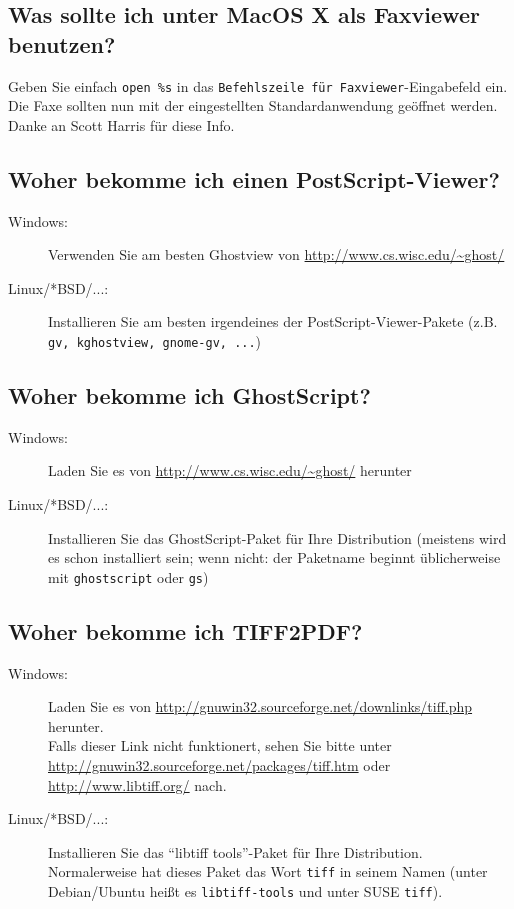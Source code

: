 \documentclass[a4paper,10pt,halfparskip,noparindent]{scrartcl}
\begin{document}
\subsection{Was sollte ich unter MacOS X als Faxviewer benutzen?}
Geben Sie einfach \verb.open %s. in das \texttt{Befehlszeile für Faxviewer}-Eingabefeld ein.
Die Faxe sollten nun mit der eingestellten Standardanwendung geöffnet werden.
Danke an Scott Harris für diese Info.

\subsection{Woher bekomme ich einen PostScript-Viewer?}
\begin{description}
\item[Windows:] Verwenden Sie am besten Ghostview von \url{http://www.cs.wisc.edu/~ghost/}
\item[Linux/*BSD/...:] Installieren Sie am besten irgendeines der PostScript-Viewer-Pakete
                (z.B. \texttt{gv, kghostview, gnome-gv, ...})
\end{description}

\subsection{Woher bekomme ich GhostScript?}
\begin{description}
\item[Windows:] Laden Sie es von \url{http://www.cs.wisc.edu/~ghost/} herunter
\item[Linux/*BSD/...:] 
Installieren Sie das GhostScript-Paket für Ihre Distribution (meistens wird es schon installiert sein; wenn nicht: der Paketname beginnt üblicherweise mit  \texttt{ghostscript} oder \texttt{gs})
\end{description}

\subsection{Woher bekomme ich TIFF2PDF?}
\begin{description}
\item[Windows:] 
Laden Sie es von \url{http://gnuwin32.sourceforge.net/downlinks/tiff.php} herunter.\\
Falls dieser Link nicht funktionert, sehen Sie bitte unter \url{http://gnuwin32.sourceforge.net/packages/tiff.htm} oder \url{http://www.libtiff.org/} nach.
\item[Linux/*BSD/...:] 
Installieren Sie das "`libtiff tools"'-Paket für Ihre Distribution. Normalerweise hat dieses Paket das Wort \texttt{tiff} in seinem Namen (unter Debian/Ubuntu heißt es \texttt{libtiff-tools} und unter SUSE \texttt{tiff}).
\end{description}
\end{document}
